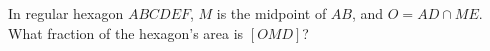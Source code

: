 In regular hexagon $ABCDEF$, $M$ is the midpoint of $AB$, and $O=AD\cap ME$. What fraction of the hexagon's area is $[OMD]$?
